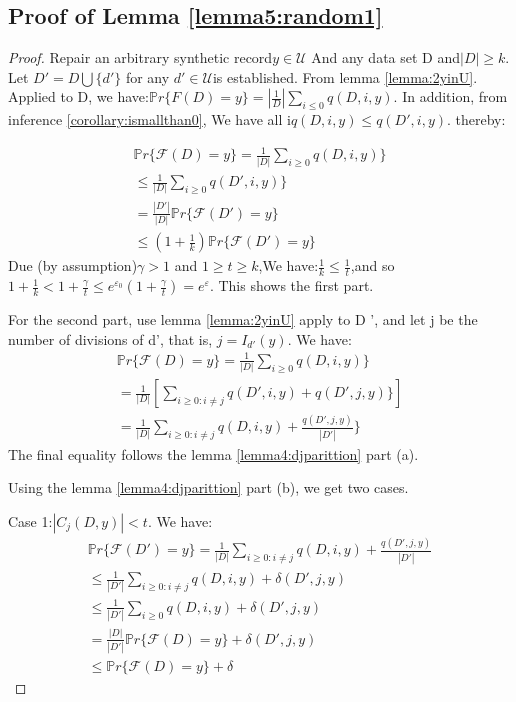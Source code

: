 \subsection{Proof of Lemma \ref{lemma5:random1}}


\begin{proof}
	Repair an arbitrary synthetic record$y\in \mathcal{U}$ And any data set D and$| D | \geq k$. Let $D'=D\bigcup\{d'\}$ for any $d'\in \mathcal{U}$is established. From lemma \ref{lemma:2yinU}. Applied to D, we have:$\mathbb{P}r \{F(D)= y\} = | \frac{1}{D} | \sum_{i \leq 0} q(D,i,y)$. In addition, from inference \ref{corollary:ismallthan0}, We have all i$q(D,i,y)\leq q(D',i,y)$. thereby:
	
	\begin{equation}
	\begin{aligned}
	\mathbb{P}r\{ \mathcal{F}(D) = y\}  = \frac{1}{|D|}\sum_{i\geq 0} q(D,i,y)\}  \\
	\leq \frac{1}{|D|}\sum_{i\geq 0} q(D',i,y)\}  \\
	= \frac{|D'|}{|D|} \mathbb{P}r\{ \mathcal{F}(D') = y\} \\
	\leq (1+ \frac{1}{k}) \mathbb{P}r\{ \mathcal{F}(D') = y\}
	\end{aligned}
	\end{equation}
	Due (by assumption)$\gamma > 1$ and $1\geq t\geq k$,We have:$\frac{1}{k} \leq \frac{1}{t}$,and so$1 + \frac{1}{k} <1 +\frac{\gamma}{t} \leq e^{\varepsilon_0} (1 +\frac{\gamma}{t})=e^\varepsilon$. This shows the first part.
	
	For the second part, use lemma \ref{lemma:2yinU} apply to D ', and let j be the number of divisions of d', that is, $ j = I_ {d '} (y) $. We have:
		\begin{equation}
	\begin{aligned}
	\mathbb{P}r\{ \mathcal{F}(D) = y\}  = \frac{1}{|D|}\sum_{i\geq 0} q(D,i,y)\}  \\
	= \frac{1}{|D|}[\sum_{i\geq 0:i\neq j} q(D',i,y)+q(D',j,y)\} ]  \\
	= \frac{1}{|D|}\sum_{i\geq 0:i\neq j} q(D,i,y)+\frac{q(D',j,y)}{|D'|}\}  
	\end{aligned}
	\end{equation}
	The final equality follows the lemma \ref{lemma4:djparittion} part (a).
	
	Using the lemma \ref{lemma4:djparittion} part (b), we get two cases.
	
	
	Case 1:$|C_j(D,y)| <t$. We have:
		\begin{equation}
\begin{aligned}
\mathbb{P}r\{ \mathcal{F}(D') = y\}  = \frac{1}{|D|}\sum_{i\geq 0:i\neq j} q(D,i,y)+\frac{q(D',j,y)}{|D'|} \\
\leq \frac{1}{|D'|} \sum_{i\geq 0:i\neq j} q(D,i,y)+ \delta (D',j,y) \\
\leq \frac{1}{|D'|} \sum_{i\geq 0} q(D,i,y)+ \delta (D',j,y) \\
=  \frac{|D|}{|D'|}\mathbb{P}r\{ \mathcal{F}(D) = y\} + \delta (D',j,y) \\
\leq \mathbb{P}r \{ \mathcal{F} (D) = y\} + \delta
\end{aligned}
\end{equation}


\end{proof}
